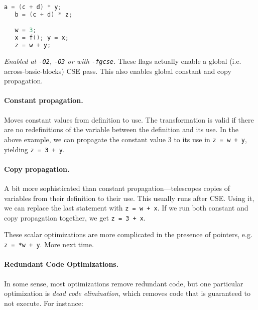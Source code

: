 \begin{lstlisting}[language=C]
   a = (c + d) * y;
   b = (c + d) * z;

   w = 3;
   x = f(); y = x;
   z = w + y;

\end{lstlisting}


\noindent \emph{Enabled at {\tt -O2}, {\tt -O3} or with {\tt -fgcse}.} 
These flags actually enable a global (i.e. across-basic-blocks) CSE pass.
This also enables global constant and copy propagation.

\paragraph{Constant propagation.} Moves constant values from definition to
use. The transformation is valid if there are no redefinitions of the
variable between the definition and its use. In the above example,
we can propagate the constant value 3 to its use in {\tt z = w + y},
yielding {\tt z = 3 + y}.

\paragraph{Copy propagation.} A bit more sophisticated than constant
propagation---telescopes copies of variables from their definition to
their use. This usually runs after CSE. Using it, we can replace the
last statement with {\tt z = w + x}. If we run both constant and copy
propagation together, we get {\tt z = 3 + x}.

These scalar optimizations are more complicated in the presence
of pointers, e.g. {\tt z = *w + y}. More next time.


\paragraph{Redundant Code Optimizations.} In some sense, most optimizations
remove redundant code, but one particular optimization is \emph{dead code
elimination}, which removes code that is guaranteed to not execute.
For instance:

